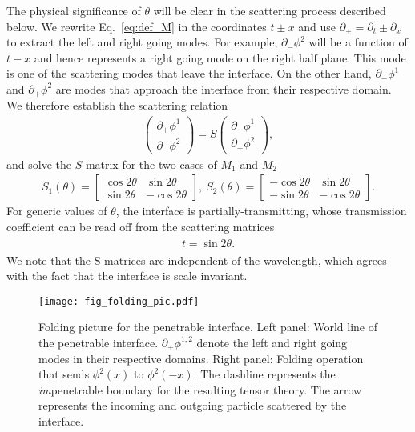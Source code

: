 The physical significance of $\theta$ will be clear in the scattering process described below. We rewrite Eq.~\eqref{eq:def_M} in the coordinates $t\pm x$ and use $\partial_{\pm} = \partial_{t} \pm \partial_x $ to extract the left and right going modes. For example, $\partial_{-} \phi^2$ will be a function of $t - x$ and hence represents a right going mode on the right half plane. This mode is one of the scattering modes that leave the interface. On the other hand, $\partial_{-} \phi^1$ and $\partial_{+} \phi^2$ are modes that approach the interface from their respective domain. We therefore establish the scattering relation 
\begin{equation}\begin{aligned}
\label{eq:def_S}
\begin{pmatrix}
\partial_+\phi^1\\
\partial_-\phi^2
\end{pmatrix}
=S
\begin{pmatrix}
\partial_-\phi^1\\
\partial_+\phi^2
\end{pmatrix},
\end{aligned}\end{equation}
and solve the $S$ matrix for the two cases of $M_1$ and $M_2$
\begin{equation}\begin{aligned}
\label{eq:S1_S2}
S_1(\theta)=\begin{bmatrix}
\cos 2\theta & \sin 2\theta \\
\sin 2\theta & -\cos 2\theta
\end{bmatrix},\
S_2(\theta)=\begin{bmatrix}
-\cos 2\theta & \sin 2\theta \\
-\sin 2\theta & -\cos 2\theta
\end{bmatrix}.
\end{aligned}\end{equation}
For generic values of $\theta$, the interface is partially-transmitting, 
{\color{red}whose transmission coefficient
can be read off from the scattering matrices
\begin{eqnarray}\begin{aligned}
t = \sin2\theta.
\end{aligned}\end{eqnarray}
}
We note that the S-matrices are independent of the wavelength, which agrees with the fact that the interface is scale invariant. 
\begin{figure}[h]
\centering
\texttt{[image: fig\_folding\_pic.pdf]}
\caption{Folding picture for the penetrable interface. Left panel: World line of the penetrable interface. $\partial_\pm\phi^{1,2}$ denote the left and right going modes in their respective domains. Right panel: Folding operation that sends $\phi^2(x)$ to $\phi^2(-x)$. The dashline represents the \emph{im}penetrable boundary for the resulting tensor theory. The arrow represents the incoming and outgoing particle scattered by the interface.}
\label{fig:folding_pic}
\end{figure}

